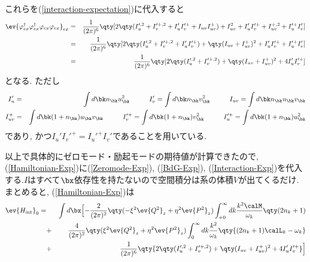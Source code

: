 \documentclass[10.5pt,a4paper]{jreport}
\def\theequation{\thechapter.\arabic{equation}}
\begin{document}
これらを(\ref{interaction-expectation})に代入すると
\begin{eqnarray}
  \ev{\varphi_{ex}^\dagger\varphi_{ex}^\dagger\varphi_{ex}\varphi_{ex}}_{ex} &=& \frac{1}{(2\pi)^6}\qty[2\qty(I_u'^{, 2} + I_v'^{+, 2} +  I_u'I_v'^{+} + I_{uv}I_{uv}^+) + I_{uv}^2 + I_u'I_v'^+ + I_{uv}^{+, 2} + I_u'^{+}I_v']\\
  &=& \frac{1}{(2\pi)^6}\qty[2\qty(I_u'^{, 2} + I_v'^{+, 2} +  I_u'I_v'^{+}) + \qty(I_{uv} + I_{uv}^{+})^2+ I_u'I_v'^+  + I_u'^{+}I_v']\\
  &=& \frac{1}{(2\pi)^6}\qty[2\qty(I_u'^{, 2} + I_v'^{+, 2}) + \qty(I_{uv} + I_{uv}^{+})^2+ 4I_u'I_v'^+]
\end{eqnarray}
となる. ただし
\begin{eqnarray}
  \nonumber I_u' &=& \int d\bk n_{\bk} u_{\bk}^2\hspace{1cm}I_v' = \int d\bk n_{\bk} v_{\bk}^2\hspace{1cm} I_{uv} = \int d\bk n_{\bk} u_{\bk}v_{\bk}\\
  \nonumber I_{uv}^+ &=& \int d\bk (1 + n_{\bk}) u_{\bk}v_{\bk} \hspace{1cm}I_v'^+ = \int d\bk (1 + n_{\bk}) v_{\bk}^2\hspace{1cm}I_u'^+ = \int d\bk (1 + n_{\bk}) u_{\bk}^2\\
\end{eqnarray}
であり, かつ$I_u'I_v'^+ = I_u'^+I_v'$であることを用いている.

以上で具体的にゼロモード・励起モードの期待値が計算できたので,
(\ref{Hamiltonian-Exp})に(\ref{Zeromode-Exp}), (\ref{BdG-Exp}),
(\ref{Interaction-Exp})を代入する.$I$はすべて$\bx$依存性を持たないので空間積分は系の体積$V$が出てくるだけ.
まとめると, (\ref{Hamiltonian-Exp})は
\begin{eqnarray}
  \nonumber  \ev{H_{\rm int}}_0 =&& \int d\bx\Bigl[-\frac{2}{(2\pi)^2}\qty(-\xi^2\ev{Q^2}_z + \eta^2\ev{P^2}_z)\int_{+0}^\infty dk\frac{k^2\calM}{\omega_k}\qty(2n_k + 1)\\
    &+& \frac{4}{(2\pi)^2}\qty(\xi^2\ev{Q^2}_z + \eta^2\ev{P^2}_z)\int_0^\infty dk\frac{k^2}{\omega_k}\qty{(2n_k + 1)\calL_k - \omega_k}\\
    &+& \frac{1}{(2\pi)^6}\qty{2\qty(I_u'^{, 2} + I_v'^{+, 2}) + \qty(I_{uv} + I_{uv}^{+})^2+ 4I_u'I_v'^+}\Bigr]
\end{eqnarray}
\renewcommand{\theequation}{\thechapter.\arabic{equation}}

\newpage
\end{document}
